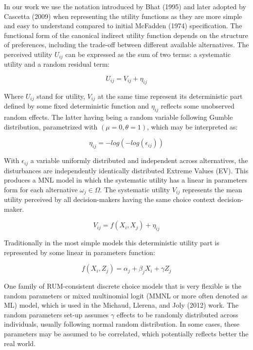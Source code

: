 \documentclass[11pt,]{article}
\begin{document}
In our work we use the notation introduced by Bhat (1995) and later
adopted by Cascetta (2009) when representing the utility functions as
they are more simple and easy to understand compared to initial McFadden
(1974) specification. The functional form of the canonical indirect
utility function depends on the structure of preferences, including the
trade-off between different available alternatives. The perceived
utility \(U_{ij}\) can be expressed as the sum of two terms: a
systematic utility and a random residual term:

\begin{equation}
U_{ij} = V_{ij} + \eta_{ij}
\end{equation}

Where \(U_{ij}\) stand for utility, \(V_{ij}\) at the same time
represent its deterministic part defined by some fixed deterministic
function and \(\eta_{ij}\) reflects some unobserved random effects. The
latter having being a random variable following Gumble distribution,
parametrized with \((\mu = 0, \theta = 1)\), which may be interpreted
as:

\begin{equation}
\eta_{ij} = - log( - log(\epsilon_{ij}))
\end{equation}

With \(\epsilon_{ij}\) a variable uniformly distributed and independent
across alternatives, the disturbances are independently identically
distributed Extreme Values (EV). This produces a MNL model in which the
systematic utility has a linear in parameters form for each alternative
\(\omega_j \in \Omega\). The systematic utility \(V_{ij}\) represents
the mean utility perceived by all decision-makers having the same choice
context decision-maker.

\begin{equation}
V_{ij} = f(X_i, X_j) + \eta_{ij}
\end{equation}

Traditionally in the most simple models this deterministic utility part
is represented by some linear in parameters function:

\begin{equation}
f(X_i, Z_j) = \alpha_j + \beta_j X_i + \gamma Z_j
\end{equation}

One family of RUM-consistent discrete choice models that is very
flexible is the random parameters or mixed multinomial logit (MMNL or
more often denoted as ML) model, which is used in the Michaud, Llerena,
and Joly (2012) work. The random parameters set-up assumes \(\gamma\)
effects to be randomly distributed across individuals, usually following
normal random distribution. In some cases, these parameters may be
assumed to be correlated, which potentially reflects better the real
world.
\end{document}
